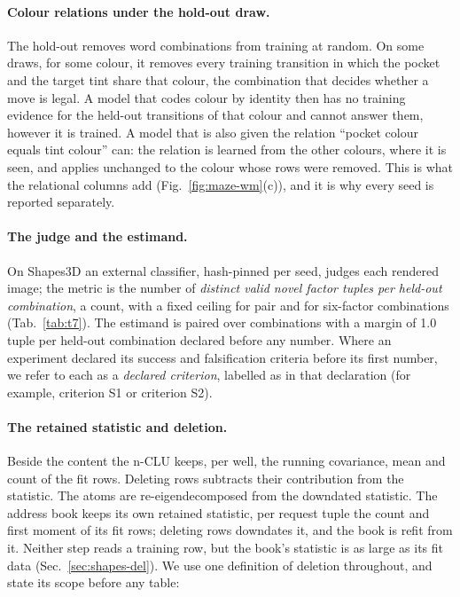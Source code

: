\documentclass{article} %
\begin{document}
\paragraph{Colour relations under the hold-out draw.} The hold-out removes word
combinations from training at random. On some draws, for some colour, it removes every training
transition in which the pocket and the target tint share that colour, the combination that decides
whether a move is legal. A model that codes colour by identity then has no training evidence for the
held-out transitions of that colour and cannot answer them, however it is trained. A model that is
also given the relation ``pocket colour equals tint colour'' can: the relation is learned from the
other colours, where it is seen, and applies unchanged to the colour whose rows were removed. This is
what the relational columns add (Fig.~\ref{fig:maze-wm}(c)), and it is why every seed is reported
separately.

\paragraph{The judge and the estimand.} On Shapes3D an external classifier, hash-pinned per
seed, judges each rendered image; the metric is the number of \emph{distinct valid novel
factor tuples per held-out combination}, a count, with a fixed ceiling for pair and for six-factor
combinations (Tab.~\ref{tab:t7}). The estimand is paired over combinations with a margin of 1.0 tuple per held-out combination declared
before any number. %
Where an experiment declared its success and falsification criteria before its first
number, we refer to each as a \emph{declared criterion}, labelled as in that
declaration (for example, criterion S1 or criterion S2).

\paragraph{The retained statistic and deletion.} Beside the content the n-CLU keeps, per
well, the running covariance, mean and count of the fit rows. Deleting rows subtracts their
contribution from the statistic. The atoms are re-eigendecomposed from the downdated
statistic. The address book keeps its own retained statistic, per request tuple the count and first
moment of its fit rows; deleting rows downdates it, and the book is refit from it. Neither step
reads a training row, but the book's statistic is as large as its fit data
(Sec.~\ref{sec:shapes-del}). We use one definition of deletion throughout, and state its scope
before any table:
\end{document}
